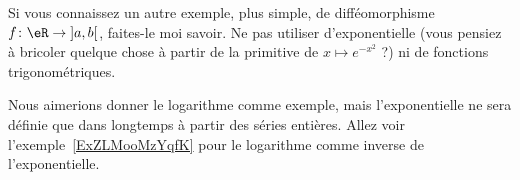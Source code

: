 \begin{probleme}
Si vous connaissez un autre exemple, plus simple, de difféomorphisme \( f\colon \eR\to \mathopen] a , b \mathclose[\), faites-le moi savoir. Ne pas utiliser d'exponentielle (vous pensiez à bricoler quelque chose à partir de la primitive de \( x\mapsto  e^{-x^2}\) ?) ni de fonctions trigonométriques.
\end{probleme}

\begin{example}
    Nous aimerions donner le logarithme comme exemple, mais l'exponentielle ne sera définie que dans longtemps à partir des séries entières. Allez voir l'exemple~\ref{ExZLMooMzYqfK} pour le logarithme comme inverse de l'exponentielle.
\end{example}

